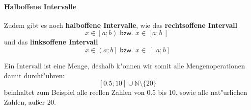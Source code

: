 \paragraph{Halboffene Intervalle}
\begin{flushleft}
Zudem gibt es noch \textbf{halboffene Intervalle}, wie das \textbf{rechtsoffene Intervall}
\begin{equation*}
x \in \left[a;b \right) \textsf{ bzw. } x \in \left[a;b \right[
\end{equation*}
und das \textbf{linksoffene Intervall}
\begin{equation*}
x \in \left(a;b \right] \textsf{ bzw. } x \in \left] a;b \right]
\end{equation*}
\end{flushleft}

\begin{warning}
Ein Intervall ist eine Menge, deshalb k"onnen wir somit alle Mengenoperationen damit durchf"uhren:
\begin{equation*}
\left[0.5;10\right] \cup \mathbb{N} \setminus \{20\}
\end{equation*}
beinhaltet zum Beispiel alle reellen Zahlen von $0.5$ bis $10$, sowie alle nat"urlichen Zahlen, außer $20$.
\end{warning}

